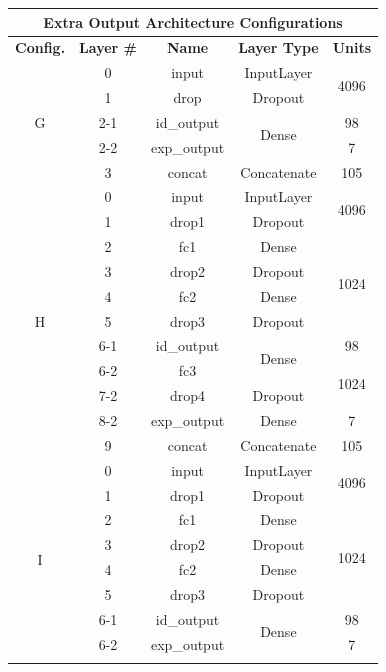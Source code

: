 \begin{table}[h!]
\begin{center}
\begin{tabular}{|c|c|c|c|c|}
\hline
\multicolumn{5}{|c|}{Extra Output Architecture Configurations} \\ \hline
\textbf{Config.} & \textbf{Layer \#} & \textbf{Name} & \textbf{Layer Type} & \textbf{Units} \\ \hline
\multirow{5}{*}{G} & 0 & input & InputLayer & \multirow{2}{*}{4096} \\ \cline{2-4}
& 1 & drop & Dropout & \\ \cline{2-5}
& 2-1 & id\_output & \multirow{2}{*}{Dense} & 98 \\ \cline{2-3} \cline{5-5}
& 2-2 & exp\_output & & 7 \\ \cline{2-5}
& 3 & concat & Concatenate & 105 \\ \hline
\multirow{11}{*}{H} & 0 & input & InputLayer & \multirow{2}{*}{4096} \\ \cline{2-4}
& 1 & drop1 & Dropout & \\ \cline{2-5}
& 2 & fc1 & Dense & \multirow{4}{*}{1024} \\ \cline{2-4}
& 3 & drop2 & Dropout & \\ \cline{2-4}
& 4 & fc2 & Dense & \\ \cline{2-4}
& 5 & drop3 & Dropout & \\ \cline{2-5}
& 6-1 & id\_output & \multirow{2}{*}{Dense} & 98 \\ \cline{2-3} \cline{5-5}
& 6-2 & fc3 & & \multirow{2}{*}{1024} \\ \cline{2-4}
& 7-2 & drop4 & Dropout & \\ \cline{2-5}
 & 8-2 & exp\_output & Dense & 7 \\ \cline{2-5}
 & 9 & concat & Concatenate & 105 \\ \hline
\multirow{9}{*}{I} & 0 & input & InputLayer & \multirow{2}{*}{4096} \\ \cline{2-4}
& 1 & drop1 & Dropout & \\ \cline{2-5}
& 2 & fc1 & Dense & \multirow{4}{*}{1024} \\ \cline{2-4}
& 3 & drop2 & Dropout & \\ \cline{2-4}
& 4 & fc2 & Dense & \\ \cline{2-4}
& 5 & drop3 & Dropout & \\ \cline{2-5}
& 6-1 & id\_output & \multirow{2}{*}{Dense} & 98 \\ \cline{2-3} \cline{5-5}
& 6-2 & exp\_output &  & 7 \\ \cline{2-5}

\end{tabular}
\end{center}
\end{table}
